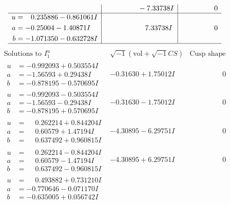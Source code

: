 \documentclass[1p]{elsarticle_modified}
\theoremstyle{definition}
\newcommand{\I}{\sqrt{-1}}
\begin{document}
$$\begin{array}{c|c|c}
 & \phantom{-0.000000 } -7.33738 I & \phantom{-0.000000 } 0 \\ \hline\begin{aligned}
u &= \phantom{-}0.235886 - 0.861061 I \\
a &= -0.25004 - 1.40871 I \\
b &= -1.071350 - 0.632728 I\end{aligned}
 & \phantom{-0.000000 -}7.33738 I & \phantom{-0.000000 } 0\\
 \hline 
 \end{array}$$\newpage$$\begin{array}{c|c|c}  
\text{Solutions to }I^u_{1}& \I (\text{vol} + \sqrt{-1}CS) & \text{Cusp shape}\\
 \hline 
\begin{aligned}
u &= -0.992093 + 0.503554 I \\
a &= -1.56593 + 0.29438 I \\
b &= -0.878195 - 0.570695 I\end{aligned}
 & -0.31630 + 1.75012 I & \phantom{-0.000000 } 0 \\ \hline\begin{aligned}
u &= -0.992093 - 0.503554 I \\
a &= -1.56593 - 0.29438 I \\
b &= -0.878195 + 0.570695 I\end{aligned}
 & -0.31630 - 1.75012 I & \phantom{-0.000000 } 0 \\ \hline\begin{aligned}
u &= \phantom{-}0.262214 + 0.844204 I \\
a &= \phantom{-}0.60579 + 1.47194 I \\
b &= \phantom{-}0.637492 + 0.960815 I\end{aligned}
 & -4.30895 - 6.29751 I & \phantom{-0.000000 } 0 \\ \hline\begin{aligned}
u &= \phantom{-}0.262214 - 0.844204 I \\
a &= \phantom{-}0.60579 - 1.47194 I \\
b &= \phantom{-}0.637492 - 0.960815 I\end{aligned}
 & -4.30895 + 6.29751 I & \phantom{-0.000000 } 0 \\ \hline\begin{aligned}
u &= \phantom{-}0.493882 + 0.731210 I \\
a &= -0.770646 - 0.071170 I \\
b &= -0.635005 + 0.056742 I\end{aligned}

\end{array}$$
\end{document}

